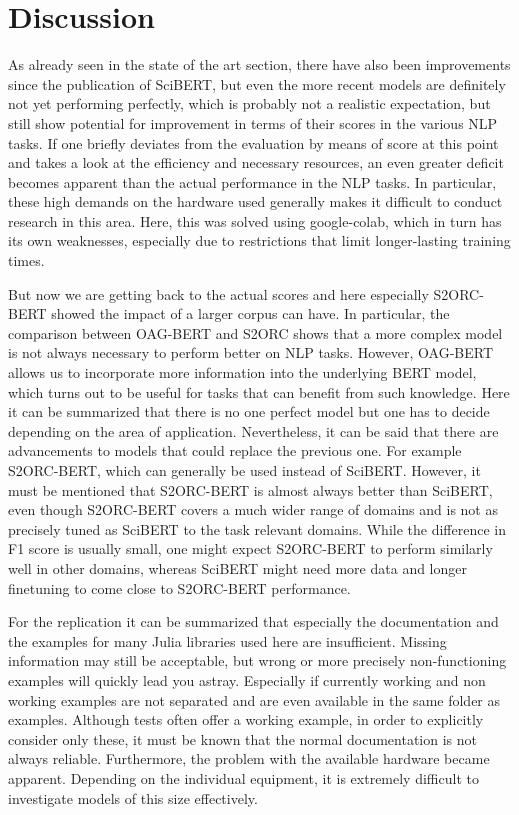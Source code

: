 \chapter{Discussion}
As already seen in the state of the art section, there have also been improvements since the publication of SciBERT, but even the more recent models are definitely not yet performing perfectly, which is probably not a realistic expectation, but still show potential for improvement in terms of their scores in the various NLP tasks. If one briefly deviates from the evaluation by means of score at this point and takes a look at the efficiency and necessary resources, an even greater deficit becomes apparent than the actual performance in the NLP tasks. In particular, these high demands on the hardware used generally makes it difficult to conduct research in this area. Here, this was solved using google-colab, which in turn has its own weaknesses, especially due to restrictions that limit longer-lasting training times. 

But now we are getting back to the actual scores and here especially S2ORC-BERT showed the impact of a larger corpus can have. In particular, the comparison between OAG-BERT and S2ORC shows that a more complex model is not always necessary to perform better on NLP tasks. However, OAG-BERT allows us to incorporate more information into the underlying BERT model, which turns out to be useful for tasks that can benefit from such knowledge. Here it can be summarized that there is no one perfect model but one has to decide depending on the area of application. Nevertheless, it can be said that there are advancements to models that could replace the previous one. For example S2ORC-BERT, which can generally be used instead of SciBERT. However, it must be mentioned that S2ORC-BERT is almost always better than SciBERT, even though S2ORC-BERT covers a much wider range of domains and is not as precisely tuned as SciBERT to the task relevant domains. While the difference in F1 score is usually small, one might expect S2ORC-BERT to perform similarly well in other domains, whereas SciBERT might need more data and longer finetuning to come close to S2ORC-BERT performance.  


For the replication it can be summarized that especially the documentation and the examples for many Julia libraries used here are insufficient. Missing information may still be acceptable, but wrong or more precisely non-functioning examples will quickly lead you astray. Especially if currently working and non working examples are not separated and are even available in the same folder as examples. Although tests often offer a working example, in order to explicitly consider only these, it must be known that the normal documentation is not always reliable. Furthermore, the problem with the available hardware became apparent. Depending on the individual equipment, it is extremely difficult to investigate models of this size effectively. 

